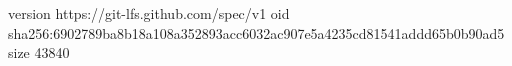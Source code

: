 version https://git-lfs.github.com/spec/v1
oid sha256:6902789ba8b18a108a352893acc6032ac907e5a4235cd81541addd65b0b90ad5
size 43840
